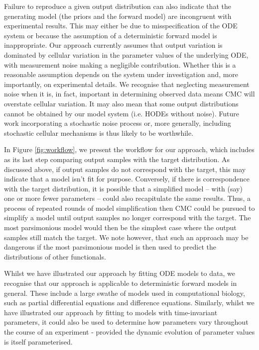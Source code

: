 Failure to reproduce a given output distribution can also indicate that the generating model (the priors and the forward model) are incongruent with experimental results. This may either be due to misspecification of the ODE system or because the assumption of a deterministic forward model is inappropriate. Our approach currently assumes that output variation is dominated by cellular variation in the parameter values of the underlying ODE, with measurement noise making a negligible contribution. Whether this is a reasonable assumption depends on the system under investigation and, more importantly, on experimental details. We recognise that neglecting measurement noise when it is, in fact, important in determining observed data means CMC will overstate cellular variation. It may also mean that some output distributions cannot be obtained by our model system (i.e. HODEs without noise). Future work incorporating a stochastic noise process or, more generally, including stochastic cellular mechanisms is thus likely to be worthwhile.

In Figure \ref{fig:workflow}, we present the workflow for our approach, which includes as its last step comparing output samples with the target distribution. As discussed above, if output samples do not correspond with the target, this may indicate that a model isn't fit for purpose. Conversely, if there is correspondence with the target distribution, it is possible that a simplified model -- with (say) one or more fewer parameters -- could also recapitulate the same results. Thus, a process of repeated rounds of model simplification then CMC could be pursued to simplify a model until output samples no longer correspond with the target. The most parsimonious model would then be the simplest case where the output samples still match the target. We note however, that such an approach may be dangerous if the most parsimonious model is then used to predict the distributions of other functionals.

Whilst we have illustrated our approach by fitting ODE models to data, we recognise that our approach is applicable to deterministic forward models in general. These include a large swathe of models used in computational biology, such as partial differential equations and difference equations. Similarly, whilst we have illustrated our approach by fitting to models with time-invariant parameters, it could also be used to determine how parameters vary throughout the course of an experiment - provided the dynamic evolution of parameter values is itself parameterised.

